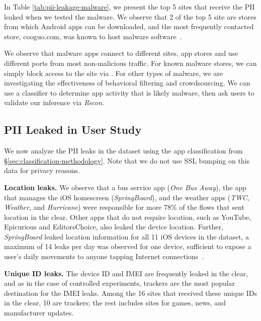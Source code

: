 In Table \ref{tab:pii-leakage-malware}, we present the top 5 sites that receive the PII leaked when we tested the malware. 
We observe that 2 of the top 5 site are stores from which Android apps can be downloaded, and the most frequently contacted store, cooguo.com, was known to host malware software~\cite{google:browsecooguo}.

 We observe that malware apps connect to different sites, app stores and use 
different ports from most non-malicious traffic. For known malware stores, we can simply block access to 
the site via \meddle. For other types of malware, we are investigating the effectiveness of behavioral 
filtering and crowdsourcing. We can use a classifier to determine app activity that is likely malware, then 
ask users to validate our inference via \emph{Recon}.

\subsection{PII Leaked in User Study}

We now analyze the PII leaks in the \mobWild{} dataset using the app classification from \S\ref{sec:classification-methodology}. 
Note that we do not use SSL bumping on this data for privacy reasons. 

\noindent\textbf{Location leaks.}
We observe that a bus service app (\emph{One Bus Away}), the app that manages the iOS homescreen (\emph{SpringBoard}), and the weather apps (\emph{TWC}, \emph{Weather}, and \emph{Hurricane}) were responsible for more 78\% of the flows that sent location in the clear. 
Other apps that do not require location, such as YouTube, Epicurious and EditorsChoice, also leaked the device location. 
Further, \emph{SpringBoard} leaked location information for all 11 iOS devices in the \mobWild dataset, a maximum of 14 leaks per day was observed for one device, sufficient to expose a user's daily movements to anyone tapping Internet connections~\cite{nsa:globaltracking}. 

\noindent\textbf{Unique ID leaks.} 
The device ID and IMEI are frequently leaked in the clear, and as in the case of controlled experiments, trackers are the most popular destination for the IMEI leaks.  
Among the 16 sites that received these unique IDs in the clear, 10 are trackers; the rest includes sites for games, news, and manufacturer updates.

